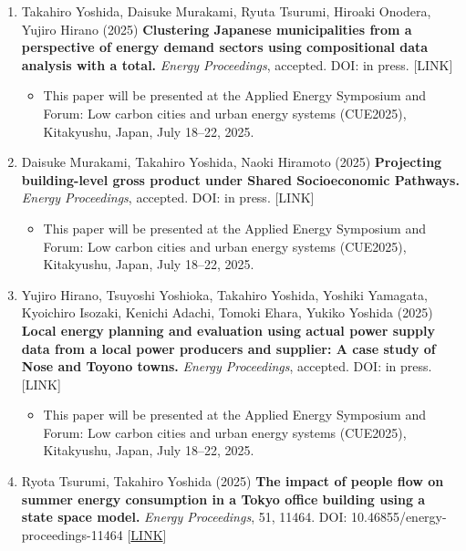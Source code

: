 \documentclass[
]{book}
\providecommand{\tightlist}{%
  \setlength{\itemsep}{0pt}\setlength{\parskip}{0pt}}
\begin{document}
\begin{enumerate}
\def\labelenumi{\arabic{enumi}.}
\tightlist
\item
  Takahiro Yoshida, Daisuke Murakami, Ryuta Tsurumi, Hiroaki Onodera, Yujiro Hirano (2025)
  \textbf{Clustering Japanese municipalities from a perspective of energy demand sectors using compositional data analysis with a total.}
  \emph{Energy Proceedings}, accepted.
  DOI: in press. {[}LINK{]}

  \begin{itemize}
  \tightlist
  \item
    This paper will be presented at the Applied Energy Symposium and Forum: Low carbon cities and urban energy systems (CUE2025), Kitakyushu, Japan, July 18--22, 2025.
  \end{itemize}
\item
  Daisuke Murakami, Takahiro Yoshida, Naoki Hiramoto (2025)
  \textbf{Projecting building-level gross product under Shared Socioeconomic Pathways.}
  \emph{Energy Proceedings}, accepted.
  DOI: in press. {[}LINK{]}

  \begin{itemize}
  \tightlist
  \item
    This paper will be presented at the Applied Energy Symposium and Forum: Low carbon cities and urban energy systems (CUE2025), Kitakyushu, Japan, July 18--22, 2025.
  \end{itemize}
\item
  Yujiro Hirano, Tsuyoshi Yoshioka, Takahiro Yoshida, Yoshiki Yamagata, Kyoichiro Isozaki, Kenichi Adachi, Tomoki Ehara, Yukiko Yoshida (2025)
  \textbf{Local energy planning and evaluation using actual power supply data from a local power producers and supplier: A case study of Nose and Toyono towns.}
  \emph{Energy Proceedings}, accepted.
  DOI: in press. {[}LINK{]}

  \begin{itemize}
  \tightlist
  \item
    This paper will be presented at the Applied Energy Symposium and Forum: Low carbon cities and urban energy systems (CUE2025), Kitakyushu, Japan, July 18--22, 2025.
  \end{itemize}
\item
  Ryota Tsurumi, Takahiro Yoshida (2025)
  \textbf{The impact of people flow on summer energy consumption in a Tokyo office building using a state space model.}
  \emph{Energy Proceedings}, 51, 11464.
  DOI: 10.46855/energy-proceedings-11464 {[}\href{https://doi.org/10.46855/energy-proceedings-11464}{LINK}{]}


\end{enumerate}
\end{document}
